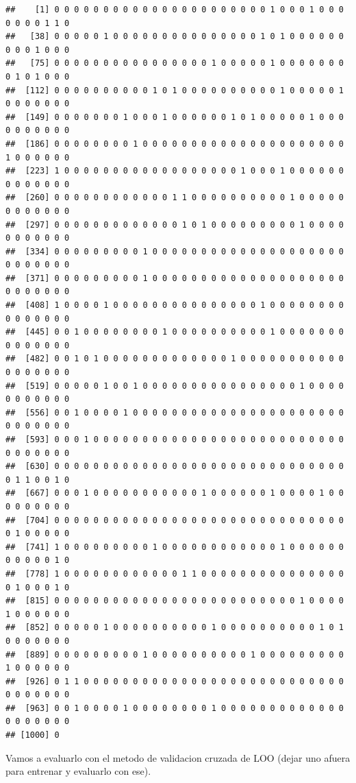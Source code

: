 \documentclass[
]{article}
\begin{document}
\begin{verbatim}
##    [1] 0 0 0 0 0 0 0 0 0 0 0 0 0 0 0 0 0 0 0 0 0 0 1 0 0 0 1 0 0 0 0 0 0 0 1 1 0
##   [38] 0 0 0 0 0 1 0 0 0 0 0 0 0 0 0 0 0 0 0 0 0 1 0 1 0 0 0 0 0 0 0 0 0 1 0 0 0
##   [75] 0 0 0 0 0 0 0 0 0 0 0 0 0 0 0 0 1 0 0 0 0 0 1 0 0 0 0 0 0 0 0 1 0 1 0 0 0
##  [112] 0 0 0 0 0 0 0 0 0 0 1 0 1 0 0 0 0 0 0 0 0 0 0 1 0 0 0 0 0 1 0 0 0 0 0 0 0
##  [149] 0 0 0 0 0 0 0 1 0 0 0 1 0 0 0 0 0 0 1 0 1 0 0 0 0 0 1 0 0 0 0 0 0 0 0 0 0
##  [186] 0 0 0 0 0 0 0 0 1 0 0 0 0 0 0 0 0 0 0 0 0 0 0 0 0 0 0 0 0 0 1 0 0 0 0 0 0
##  [223] 1 0 0 0 0 0 0 0 0 0 0 0 0 0 0 0 0 0 0 1 0 0 0 1 0 0 0 0 0 0 0 0 0 0 0 0 0
##  [260] 0 0 0 0 0 0 0 0 0 0 0 0 1 1 0 0 0 0 0 0 0 0 0 0 1 0 0 0 0 0 0 0 0 0 0 0 0
##  [297] 0 0 0 0 0 0 0 0 0 0 0 0 0 1 0 1 0 0 0 0 0 0 0 0 0 1 0 0 0 0 0 0 0 0 0 0 0
##  [334] 0 0 0 0 0 0 0 0 0 1 0 0 0 0 0 0 0 0 0 0 0 0 0 0 0 0 0 0 0 0 0 0 0 0 0 0 0
##  [371] 0 0 0 0 0 0 0 0 0 1 0 0 0 0 0 0 0 0 0 0 0 0 0 0 0 0 0 0 0 0 0 0 0 0 0 0 0
##  [408] 1 0 0 0 0 1 0 0 0 0 0 0 0 0 0 0 0 0 0 0 0 1 0 0 0 0 0 0 0 0 0 0 0 0 0 0 0
##  [445] 0 0 1 0 0 0 0 0 0 0 0 1 0 0 0 0 0 0 0 0 0 0 1 0 0 0 0 0 0 0 0 0 0 0 0 0 0
##  [482] 0 0 1 0 1 0 0 0 0 0 0 0 0 0 0 0 0 0 1 0 0 0 0 0 0 0 0 0 0 0 0 0 0 0 0 0 0
##  [519] 0 0 0 0 0 1 0 0 1 0 0 0 0 0 0 0 0 0 0 0 0 0 0 0 0 1 0 0 0 0 0 0 0 0 0 0 0
##  [556] 0 0 1 0 0 0 0 1 0 0 0 0 0 0 0 0 0 0 0 0 0 0 0 0 0 0 0 0 0 0 0 0 0 0 0 0 0
##  [593] 0 0 0 1 0 0 0 0 0 0 0 0 0 0 0 0 0 0 0 0 0 0 0 0 0 0 0 0 0 0 0 0 0 0 0 0 0
##  [630] 0 0 0 0 0 0 0 0 0 0 0 0 0 0 0 0 0 0 0 0 0 0 0 0 0 0 0 0 0 0 0 1 1 0 0 1 0
##  [667] 0 0 0 1 0 0 0 0 0 0 0 0 0 0 0 1 0 0 0 0 0 0 1 0 0 0 0 1 0 0 0 0 0 0 0 0 0
##  [704] 0 0 0 0 0 0 0 0 0 0 0 0 0 0 0 0 0 0 0 0 0 0 0 0 0 0 0 0 0 0 0 1 0 0 0 0 0
##  [741] 1 0 0 0 0 0 0 0 0 0 1 0 0 0 0 0 0 0 0 0 0 0 0 1 0 0 0 0 0 0 0 0 0 0 0 1 0
##  [778] 1 0 0 0 0 0 0 0 0 0 0 0 0 1 1 0 0 0 0 0 0 0 0 0 0 0 0 0 0 0 0 1 0 0 0 1 0
##  [815] 0 0 0 0 0 0 0 0 0 0 0 0 0 0 0 0 0 0 0 0 0 0 0 0 0 1 0 0 0 0 1 0 0 0 0 0 0
##  [852] 0 0 0 0 0 1 0 0 0 0 0 0 0 0 0 0 1 0 0 0 0 0 0 0 0 0 0 1 0 1 0 0 0 0 0 0 0
##  [889] 0 0 0 0 0 0 0 0 0 1 0 0 0 0 0 0 0 0 0 0 1 0 0 0 0 0 0 0 0 0 1 0 0 0 0 0 0
##  [926] 0 1 1 0 0 0 0 0 0 0 0 0 0 0 0 0 0 0 0 0 0 0 0 0 0 0 0 0 0 0 0 0 0 0 0 0 0
##  [963] 0 0 1 0 0 0 0 1 0 0 0 0 0 0 0 0 1 0 0 0 0 0 0 0 0 0 0 0 0 0 0 0 0 0 0 0 0
## [1000] 0
\end{verbatim}

Vamos a evaluarlo con el metodo de validacion cruzada de LOO (dejar uno
afuera para entrenar y evaluarlo con ese).
\end{document}
